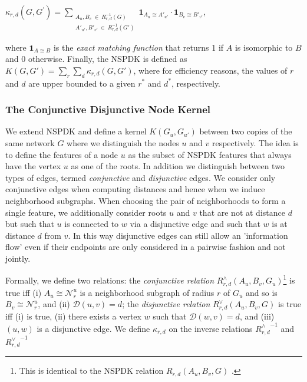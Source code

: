 \documentclass{esannV2}
\begin{document}
\begin{center}
$\kappa_{r,d}(G,G^{'}) = 
\!\!\!\!\!\!\!\!\!\!\!\! 
\sum\limits_{\substack{A_u, B_v \ \in \ R_{r,d}^{-1}(G) \\ 
{A'}_{u'}, {B'}_{v'} \ \in \ R_{r,d}^{-1}(G')
}} \!\!\!\!\!\!\!\!\!\!\!\!  { { \textbf{1}_{A_{u} \cong A'_{u'}}} \cdot {
\textbf{1}_{B_{v} \cong B'_{v'}}} }$, 
\end{center} 


where $\textbf{1}_{A \cong
B}$ is the \textit{exact matching function} that returns 1 if $A$ is
isomorphic to $B$ and 0 otherwise.  Finally, the NSPDK is defined as $K(G,G')
= \sum\limits_{r}{\sum\limits_{d}{\kappa_{r,d}(G,G')}}$, where for efficiency
reasons, the values of $r$ and $d$ are upper bounded to a given $r^*$ and
$d^*$, respectively.

\subsubsection{The Conjunctive Disjunctive Node Kernel}

We extend NSPDK and define a kernel $K(G_u,G_{u'})$ between two copies of the
same network $G$ where we distinguish the nodes $u$ and $v$ respectively. The
idea is to define the features of a node $u$ as the subset of NSPDK features
that always have the vertex $u$ as one of the roots. In addition we
distinguish between two types of edges, termed {\em conjunctive} and {\em
disjunctive} edges. We consider only conjunctive edges when computing
distances and hence when we induce neighborhood subgraphs. When choosing the
pair of neighborhoods to form a single feature, we additionally consider roots
$u$ and $v$ that are not at distance $d$ but such that $u$ is connected to $w$
via a disjunctive edge and such that $w$ is at distance $d$ from $v$. In this
way disjunctive edges can still allow an 'information flow' even if their
endpoints are only considered in a pairwise fashion and not jointly.

Formally, we define two relations: the \textit{conjunctive relation}
$R^{\wedge}_{r,d}(A_u, B_v, G_u)$\footnote{This is identical to the NSPDK relation $R_{r,d}(A_u, B_v, G)$ .}  is true iff (i) $A_u \cong \mathcal{N}_r^u$ is a neighborhood subgraph of radius $r$ of $G_u$ and so is $B_v \cong \mathcal{N}_r^u$,  and (ii) $\mathcal{D}(u,v)= d$; the
\textit{disjunctive relation} $R_{r,d}^{\vee}(A_u, B_v, G)$ is true iff (i)
is true, (ii) there
exists a vertex $w$ such that $\mathcal{D}(w,v)= d$, and (iii) $(u,w)$ is a
disjunctive edge. We define $\kappa_{r,d}$ on the  inverse relations ${R^{\wedge}_{r,d}}^{ -1}$
and ${R^{\vee}_{r,d}}^{ -1}$
\end{document}
